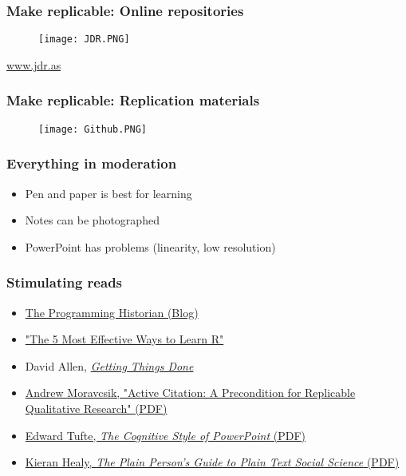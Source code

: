 \documentclass{beamer}
\begin{document}
\begin{frame}
\frametitle{Make replicable: \newline Online repositories}
    \begin{figure}
        \centering
        \texttt{[image: JDR.PNG]}
    \end{figure}
    \begin{center}
        \small{\url{www.jdr.as}}
    \end{center}
\end{frame}

\begin{frame}
\frametitle{Make replicable: \newline Replication materials}
    \begin{figure}
        \centering
        \texttt{[image: Github.PNG]}
    \end{figure}
\end{frame}

\begin{frame}
\frametitle{Everything in moderation}
    \begin{itemize}
        \item Pen and paper is best for learning
        \item Notes can be photographed
        \item PowerPoint has problems (linearity, low resolution)
    \end{itemize}
\end{frame}

\begin{frame}
\frametitle{Stimulating reads}
    \begin{itemize}
        \item \href{https://programminghistorian.org/}{The Programming Historian (Blog)}
        \item \href{https://www.r-bloggers.com/2017/03/the-5-most-effective-ways-to-learn-r/}{"The 5 Most Effective Ways to Learn R"} 
        \item David Allen, \href{https://www.amazon.co.uk/Getting-Things-Done-Stress-free-Productivity/dp/0349408947}{\textit{Getting Things Done}}
        \item \href{https://www.princeton.edu/~amoravcs/library/ps.pdf}{Andrew Moravcsik, "Active Citation: A Precondition for Replicable Qualitative Research" (PDF)}
        \item \href{https://www.inf.ed.ac.uk/teaching/courses/pi/2016_2017/phil/tufte-powerpoint.pdf}{Edward Tufte, \textit{The Cognitive Style of PowerPoint} (PDF)}
        \item \href{https://kieranhealy.org/publications/plain-person-text/}{Kieran Healy, \textit{The Plain Person’s Guide to Plain Text Social Science} (PDF)}
    \end{itemize}
\end{frame}
\end{document}

